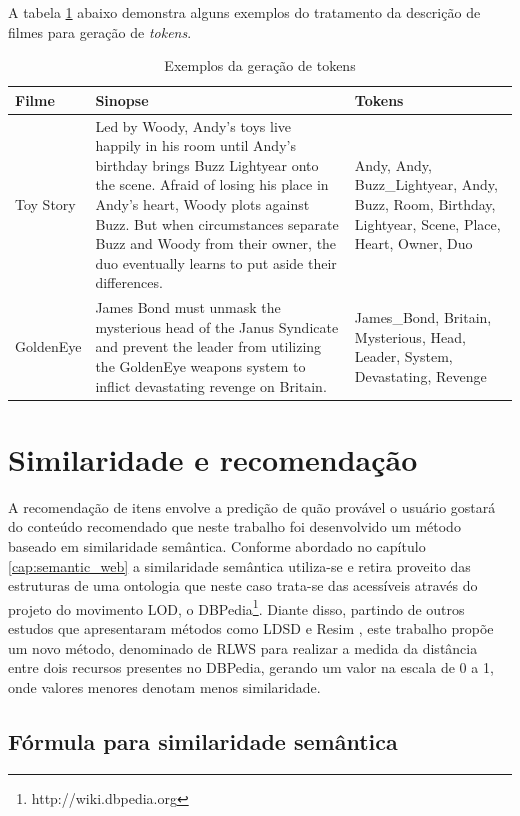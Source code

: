 A tabela \ref{tab:nlp_example} abaixo demonstra alguns exemplos do tratamento da descrição de filmes para geração de \textit{tokens}. 

\begin{table}[]
	\label{tab:nlp_example}
	\centering
	\caption{Exemplos da geração de tokens}
	\def\arraystretch{1.3} %
	\begin{tabular}{|p{2cm}|p{6cm}|p{6cm}|}
	\hline
	\textbf{Filme} & \textbf{Sinopse} & \textbf{Tokens} \\ \hline
	Toy Story & Led by Woody, Andy's toys live happily in his room until Andy's birthday brings Buzz Lightyear onto the scene. Afraid of losing his place in Andy's heart, Woody plots against Buzz. But when circumstances separate Buzz and Woody from their owner, the duo eventually learns to put aside their differences. & Andy, Andy, Buzz\_Lightyear, Andy, Buzz, Room, Birthday, Lightyear, Scene, Place, Heart, Owner, Duo \\ \hline
	GoldenEye & James Bond must unmask the mysterious head of the Janus Syndicate and prevent the leader from utilizing the GoldenEye weapons system to inflict devastating revenge on Britain. & James\_Bond, Britain, Mysterious, Head, Leader, System, Devastating, Revenge \\ \hline
	\end{tabular}
\end{table}

\section{Similaridade e recomendação}

A recomendação de itens envolve a predição de quão provável o usuário gostará do conteúdo recomendado que neste trabalho foi desenvolvido um método baseado em similaridade semântica. Conforme abordado no capítulo \ref{cap:semantic_web} a similaridade semântica utiliza-se e retira proveito das estruturas de uma ontologia que neste caso trata-se das acessíveis através do projeto do movimento \ac{LOD}, o DBPedia\footnote{http://wiki.dbpedia.org}. Diante disso, partindo de outros estudos que apresentaram métodos como LDSD \citep{PassantLDSD} e Resim \citep{PiaoResim}, este trabalho propõe um novo método, denominado de \ac{RLWS} para realizar a medida da distância entre dois recursos presentes no DBPedia, gerando um valor na escala de 0 a 1, onde valores menores denotam menos similaridade. 

\subsection{Fórmula para similaridade semântica}

